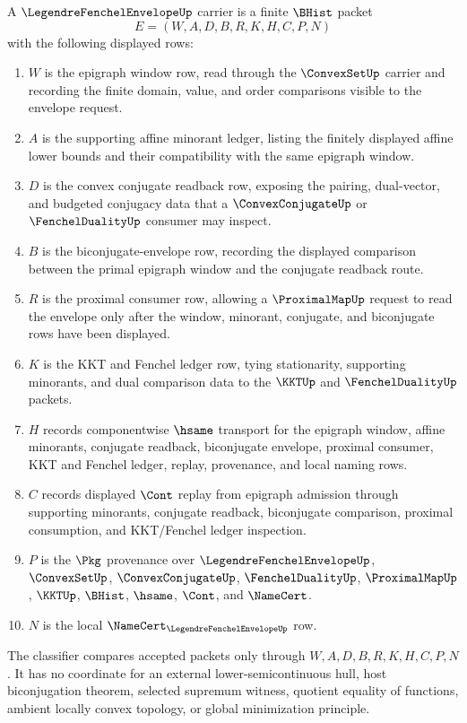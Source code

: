 \begin{definition}
\label{def:legendre-fenchel-envelope}
A $\LegendreFenchelEnvelopeUp$ carrier is a finite $\BHist$ packet
$$
E=(W,A,D,B,R,K,H,C,P,N)
$$
with the following displayed rows:
\begin{enumerate}
\item $W$ is the epigraph window row, read through the $\ConvexSetUp$ carrier and recording the finite domain, value, and order comparisons visible to the envelope request.
\item $A$ is the supporting affine minorant ledger, listing the finitely displayed affine lower bounds and their compatibility with the same epigraph window.
\item $D$ is the convex conjugate readback row, exposing the pairing, dual-vector, and budgeted conjugacy data that a $\ConvexConjugateUp$ or $\FenchelDualityUp$ consumer may inspect.
\item $B$ is the biconjugate-envelope row, recording the displayed comparison between the primal epigraph window and the conjugate readback route.
\item $R$ is the proximal consumer row, allowing a $\ProximalMapUp$ request to read the envelope only after the window, minorant, conjugate, and biconjugate rows have been displayed.
\item $K$ is the KKT and Fenchel ledger row, tying stationarity, supporting minorants, and dual comparison data to the $\KKTUp$ and $\FenchelDualityUp$ packets.
\item $H$ records componentwise $\hsame$ transport for the epigraph window, affine minorants, conjugate readback, biconjugate envelope, proximal consumer, KKT and Fenchel ledger, replay, provenance, and local naming rows.
\item $C$ records displayed $\Cont$ replay from epigraph admission through supporting minorants, conjugate readback, biconjugate comparison, proximal consumption, and KKT/Fenchel ledger inspection.
\item $P$ is the $\Pkg$ provenance over $\LegendreFenchelEnvelopeUp$, $\ConvexSetUp$, $\ConvexConjugateUp$, $\FenchelDualityUp$, $\ProximalMapUp$, $\KKTUp$, $\BHist$, $\hsame$, $\Cont$, and $\NameCert$.
\item $N$ is the local $\NameCert_{\LegendreFenchelEnvelopeUp}$ row.
\end{enumerate}
The classifier compares accepted packets only through $W,A,D,B,R,K,H,C,P,N$. It has no coordinate for an external lower-semicontinuous hull, host biconjugation theorem, selected supremum witness, quotient equality of functions, ambient locally convex topology, or global minimization principle.
\end{definition}

